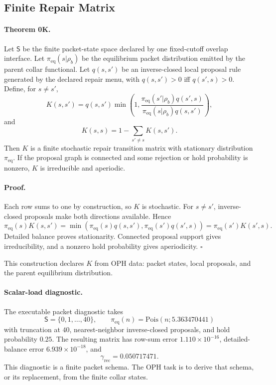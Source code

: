 \documentclass[11pt]{article}
\begin{document}
\subsection{Finite Repair Matrix}

\paragraph{Theorem 0K.}
Let \(\mathsf S\) be the finite packet-state space declared by one
fixed-cutoff overlap interface.  Let \(\pi_{\mathrm{eq}}(s|\rho_b)\) be the
equilibrium packet distribution emitted by the parent collar functional.  Let
\(q(s,s')\) be an inverse-closed local proposal rule generated by the declared
repair menu, with \(q(s,s')>0\) iff \(q(s',s)>0\).  Define, for \(s\ne s'\),
\begin{equation}
  K(s,s')
  =
  q(s,s')
  \min\!\left(
    1,
    \frac{\pi_{\mathrm{eq}}(s'|\rho_b)q(s',s)}
         {\pi_{\mathrm{eq}}(s|\rho_b)q(s,s')}
  \right),
\end{equation}
and
\begin{equation}
  K(s,s)=1-\sum_{s'\ne s}K(s,s').
\end{equation}
Then \(K\) is a finite stochastic repair transition matrix with stationary
distribution \(\pi_{\mathrm{eq}}\).  If the proposal graph is connected and
some rejection or hold probability is nonzero, \(K\) is irreducible and
aperiodic.

\paragraph{Proof.}
Each row sums to one by construction, so \(K\) is stochastic.  For
\(s\ne s'\), inverse-closed proposals make both directions available.  Hence
\begin{equation}
  \pi_{\mathrm{eq}}(s)K(s,s')
  =
  \min\!\left(
    \pi_{\mathrm{eq}}(s)q(s,s'),
    \pi_{\mathrm{eq}}(s')q(s',s)
  \right)
  =
  \pi_{\mathrm{eq}}(s')K(s',s).
\end{equation}
Detailed balance proves stationarity.  Connected proposal support gives
irreducibility, and a nonzero hold probability gives aperiodicity. \(\square\)

This construction declares \(K\) from OPH data: packet states, local proposals,
and the parent equilibrium distribution.

\paragraph{Scalar-load diagnostic.}
The executable packet diagnostic takes
\[
  \mathsf S=\{0,1,\ldots,40\},
  \qquad
  \pi_{\mathrm{eq}}(n)=
  \mathrm{Pois}\!\left(n;5.363470441\right)
\]
with truncation at \(40\), nearest-neighbor inverse-closed proposals, and
hold probability \(0.25\).  The resulting matrix has row-sum error
\(1.110\times10^{-16}\), detailed-balance error \(6.939\times10^{-18}\), and
\[
  \gamma_{\mathrm{rec}}=0.050717471.
\]
This diagnostic is a finite packet schema.  The OPH task is to derive that
schema, or its replacement, from the finite collar states.
\end{document}
